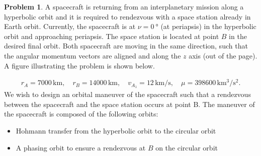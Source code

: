 \documentclass[10pt]{article}
\theoremstyle{definition}
\newtheorem{prob}{Problem}[section]
\begin{document}
\clearpage\newpage
\begin{prob}
A spacecraft is returning from an interplanetary mission along a hyperbolic orbit and it is required to rendezvous with a space station already in Earth orbit.
Currently, the spacecraft is at \( \nu = \SI{0}{\degree} \) (at periapsis) in the hyperbolic orbit and approaching periapsis.
The space station is located at point \( B\) in the desired final orbit.
Both spacecraft are moving in the same direction, such that the angular momentum vectors are aligned and along the \( z \) axis (out of the  page).
A figure illustrating the problem is shown below.

\begin{figure}[htbp]
    \centering
    \begin{scaletikzpicturetowidth}{0.3\textwidth}
\end{scaletikzpicturetowidth}
\end{figure}
\begin{gather*}
r_A=7000\,\mathrm{km},\quad r_B=14000\,\mathrm{km},\quad v_{A_1}=12\,\mathrm{km/s},\quad \mu =398600\,\mathrm{km^3/s^2}.
\end{gather*}
We wish to design an orbital maneuver of the spacecraft such that a rendezvous between the spacecraft and the space station occurs at point B. 
The maneuver of the spacecraft is composed of the following orbits:

\begin{itemize}
    \item Hohmann transfer from the hyperbolic orbit to the circular orbit
    \item A phasing orbit to ensure a rendezvous at $B$ on the circular orbit
\end{itemize}


\end{prob}
\end{document}
